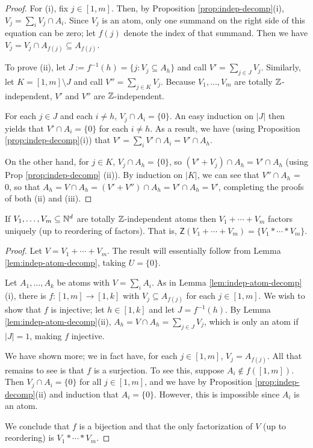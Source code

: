 \begin{proof}
For (i), fix $j\in [ 1,m ]$.
Then, by Proposition \ref{prop:indep-decomp}(i), $V_j = \sum_i V_j \cap A_i$.
Since $V_j$ is an atom, only one summand on the right side of this equation can be zero; let $f(j)$ denote the index of that summand.
Then we have $V_j = V_j \cap A_{f(j)} \subseteq A_{f(j)}$.

To prove (ii), let $J := f^{-1}(h) = \{j: V_j \subseteq A_h\}$ and call $V' = \sum_{j\in J} V_j$.
Similarly, let $K = [ 1,m ] \setminus J$ and call $V'' = \sum_{j\in K} V_j$.
Because $V_1,\dots, V_m$ are totally $\mathbb{Z}$-independent, $V'$ and $V''$ are $\mathbb{Z}$-independent.

For each $j\in J$ and each $i\neq h$, $V_j\cap A_i = \{0\}$. 
An easy induction on $|J|$ then yields that $V' \cap A_i = \{0\}$ for each $i\neq h$.
As a result, we have (using Proposition \ref{prop:indep-decomp}(i)) that $V' = \sum_i V'\cap A_i = V' \cap A_h$.

On the other hand, for $j\in K$, $V_j\cap A_h = \{0\}$, so $(V' + V_j) \cap A_h = V' \cap A_h$ (using Prop \ref{prop:indep-decomp} (ii)).
By induction on $|K|$, we can see that $V'' \cap A_h$ = 0, so that $A_h = V\cap A_h = (V' + V'')\cap A_h = V' \cap A_h = V'$, completing the proofs of both (ii) and (iii).
\end{proof}

\begin{thm} \label{thm:ind-atoms}
If $V_1,\dots,V_m\subseteq \mathbb{N}^d$ are totally $\mathbb{Z}$-independent atoms then $V_1+\cdots+V_m$ factors uniquely (up to reordering of factors).
That is, $\mathsf{Z}(V_1+\cdots+V_m) = \{ V_1*\cdots*V_m\}$.
\end{thm}

\begin{proof}
Let $V = V_1+\cdots + V_m$.
The result will essentially follow from Lemma \ref{lem:indep-atom-decomp}, taking $U = \{0\}$.

Let $A_1,\dots, A_k$ be atoms with $V = \sum_i A_i$.
As in Lemma \ref{lem:indep-atom-decomp}(i), there is $f:[ 1,m ] \to [ 1,k]$ with $V_j \subseteq A_{f(j)}$ for each $j\in [ 1,m]$.
We wish to show that $f$ is injective; let $h\in [ 1,k ]$ and let $J = f^{-1}(h)$.
By Lemma \ref{lem:indep-atom-decomp}(ii), $A_h = V \cap A_h = \sum_{j\in J} V_j$, which is only an atom if $|J|=1$, making $f$ injective.  

We have shown more; we in fact have, for each $j\in [ 1,m ]$, $V_j = A_{f(j)}$.
All that remains to see is that $f$ is a surjection.
To see this, suppose $A_i \notin f([ 1,m ])$.
Then $V_j \cap A_i = \{0\}$ for all $j\in  [ 1,m ]$, and we have by Proposition \ref{prop:indep-decomp}(ii) and induction that $A_i = \{0\}$.
However, this is impossible since $A_i$ is an atom.  

We conclude that $f$ is a bijection and that the only factorization of $V$ (up to reordering) is $V_1*\cdots*V_m$.
\end{proof}

